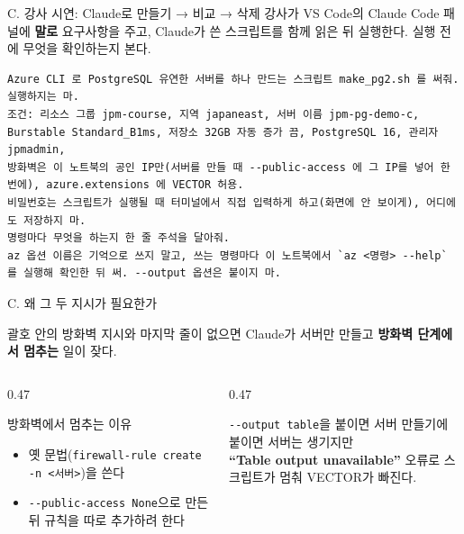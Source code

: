 \begin{frame}[fragile]{C. 강사 시연: Claude로 만들기 → 비교 → 삭제}
\small 강사가 VS Code의 Claude Code 패널에 \textbf{말로} 요구사항을 주고, Claude가 쓴 스크립트를 함께 읽은 뒤 실행한다. \alert{실행 전에 무엇을 확인하는지} 본다.
\vspace{0.3em}
\begin{Verbatim}
Azure CLI 로 PostgreSQL 유연한 서버를 하나 만드는 스크립트 make_pg2.sh 를 써줘. 실행하지는 마.
조건: 리소스 그룹 jpm-course, 지역 japaneast, 서버 이름 jpm-pg-demo-c,
Burstable Standard_B1ms, 저장소 32GB 자동 증가 끔, PostgreSQL 16, 관리자 jpmadmin,
방화벽은 이 노트북의 공인 IP만(서버를 만들 때 --public-access 에 그 IP를 넣어 한 번에), azure.extensions 에 VECTOR 허용.
비밀번호는 스크립트가 실행될 때 터미널에서 직접 입력하게 하고(화면에 안 보이게), 어디에도 저장하지 마.
명령마다 무엇을 하는지 한 줄 주석을 달아줘.
az 옵션 이름은 기억으로 쓰지 말고, 쓰는 명령마다 이 노트북에서 `az <명령> --help` 를 실행해 확인한 뒤 써. --output 옵션은 붙이지 마.
\end{Verbatim}
\end{frame}

\begin{frame}{C. 왜 그 두 지시가 필요한가}
\small
\begin{alertblock}{괄호 안의 방화벽 지시와 마지막 줄이 없으면}
Claude가 서버만 만들고 \textbf{방화벽 단계에서 멈추는} 일이 잦다.
\end{alertblock}
\vspace{0.2em}
\begin{columns}[T]
\begin{column}{0.47\textwidth}
\begin{block}{방화벽에서 멈추는 이유}
\begin{itemize}
\item 옛 문법(\texttt{firewall-rule create -n <서버>})을 쓴다
\item \texttt{-{}-public-access None}으로 만든 뒤 규칙을 따로 추가하려 한다
\end{itemize}
\end{block}
\end{column}
\begin{column}{0.47\textwidth}
\begin{block}{\texttt{-{}-output table}을 붙이면}
서버 만들기에 붙이면 서버는 생기지만\\
\textbf{``Table output unavailable''} 오류로 스크립트가 멈춰 \alert{VECTOR가 빠진다}.
\end{block}
\end{column}
\end{columns}
\end{frame}

